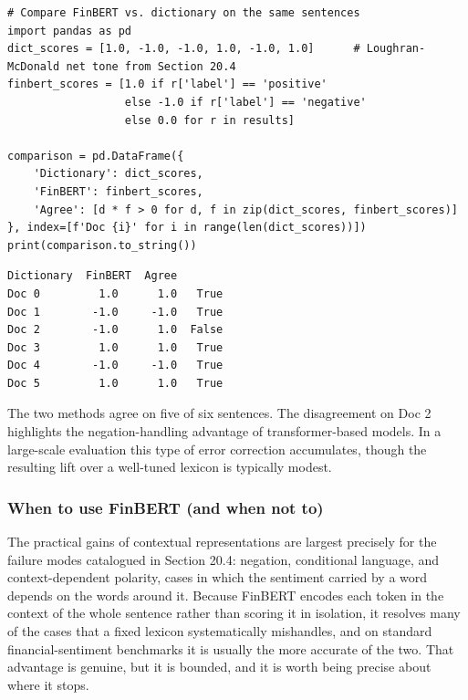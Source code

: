 \begin{verbatim}
# Compare FinBERT vs. dictionary on the same sentences
import pandas as pd
dict_scores = [1.0, -1.0, -1.0, 1.0, -1.0, 1.0]      # Loughran-McDonald net tone from Section 20.4
finbert_scores = [1.0 if r['label'] == 'positive'
                  else -1.0 if r['label'] == 'negative'
                  else 0.0 for r in results]

comparison = pd.DataFrame({
    'Dictionary': dict_scores,
    'FinBERT': finbert_scores,
    'Agree': [d * f > 0 for d, f in zip(dict_scores, finbert_scores)]
}, index=[f'Doc {i}' for i in range(len(dict_scores))])
print(comparison.to_string())
\end{verbatim}

\begin{verbatim}
Dictionary  FinBERT  Agree
Doc 0         1.0      1.0   True
Doc 1        -1.0     -1.0   True
Doc 2        -1.0      1.0  False
Doc 3         1.0      1.0   True
Doc 4        -1.0     -1.0   True
Doc 5         1.0      1.0   True
\end{verbatim}

The two methods agree on five of six sentences. The disagreement on Doc 2 highlights the negation-handling advantage of transformer-based models. In a large-scale evaluation this type of error correction accumulates, though the resulting lift over a well-tuned lexicon is typically modest.

\subsubsection{When to use FinBERT (and when not to)}

The practical gains of contextual representations are largest precisely for the failure modes catalogued in Section 20.4: negation, conditional language, and context-dependent polarity, cases in which the sentiment carried by a word depends on the words around it. Because FinBERT encodes each token in the context of the whole sentence rather than scoring it in isolation, it resolves many of the cases that a fixed lexicon systematically mishandles, and on standard financial-sentiment benchmarks it is usually the more accurate of the two. That advantage is genuine, but it is bounded, and it is worth being precise about where it stops.

